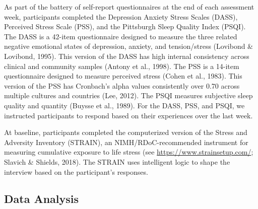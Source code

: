 \documentclass[authordate, empirical]{jote-new-article}
\begin{document}
As part of the battery of self-report questionnaires at the end of each assessment week, participants completed the Depression Anxiety Stress Scales (DASS), Perceived Stress Scale (PSS), and the Pittsburgh Sleep Quality Index (PSQI). The DASS is a 42-item questionnaire designed to measure the three related negative emotional states of depression, anxiety, and tension/stress (Lovibond \& Lovibond, 1995). This version of the DASS has high internal consistency across clinical and community samples (Antony et al., 1998). The PSS is a 14-item questionnaire designed to measure perceived stress (Cohen et al., 1983). This version of the PSS has Cronbach's alpha values consistently over 0.70 across multiple cultures and countries (Lee, 2012). The PSQI measures subjective sleep quality and quantity (Buysse et al., 1989). For the DASS, PSS, and PSQI, we instructed participants to respond based on their experiences over the last week.



At baseline, participants completed the computerized version of the Stress and Adversity Inventory (STRAIN), an NIMH/RDoC-recommended instrument for measuring cumulative exposure to life stress (see \url{https://www.strainsetup.com/}; Slavich \& Shields, 2018). The STRAIN uses intelligent logic to shape the interview based on the participant's responses.






\subsection{Data Analysis}
\end{document}

